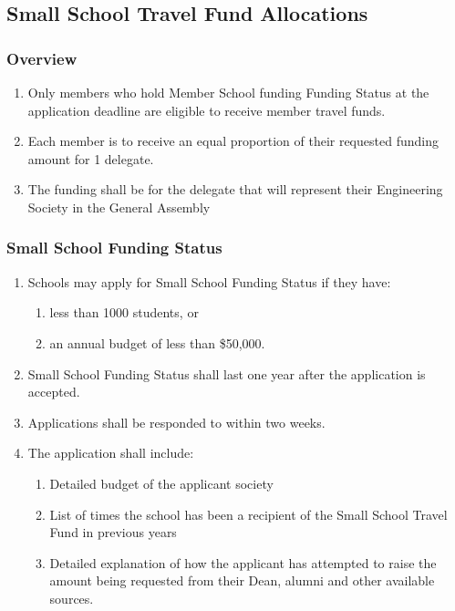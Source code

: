 \subsection{Small School Travel Fund Allocations}
\label{small-school-travel-fund-allocations}

\subsubsection{Overview}
\label{overview-2}

\begin{enumerate}
 \item
  Only members who hold Member School funding Funding Status at the application deadline are eligible to receive member travel funds.
 \item
  Each member is to receive an equal proportion of their requested funding amount for 1 delegate.
 \item
  The funding shall be for the delegate that will represent their Engineering Society in the General Assembly
\end{enumerate}

\subsubsection{Small School Funding Status}
\label{small-school-funding-status}

\begin{enumerate}
 \item
  Schools may apply for Small School Funding Status if they have:

  \begin{enumerate}
   \item
    less than 1000 students, or
   \item
    an annual budget of less than \$50,000.
  \end{enumerate}

 \item
  Small School Funding Status shall last one year after the application is accepted.
 \item
  Applications shall be responded to within two weeks.
 \item
  The application shall include:

  \begin{enumerate}
   \item
    Detailed budget of the applicant society
   \item
    List of times the school has been a recipient of the Small School Travel Fund in previous years
   \item
    Detailed explanation of how the applicant has attempted to raise the amount being requested from their Dean, alumni and other available sources.
  \end{enumerate}
\end{enumerate}

